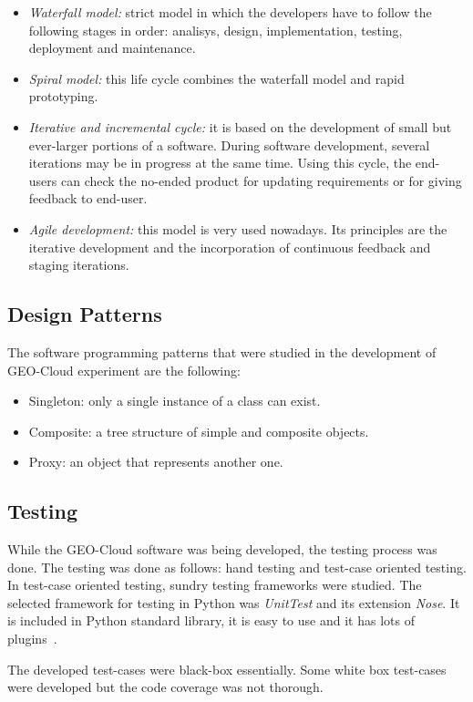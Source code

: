 \begin{itemize}
\item \emph{Waterfall model:} strict model in which the developers have to
  follow the following stages in order: analisys, design, implementation, testing, deployment and maintenance.
\item \emph{Spiral model:} this life cycle combines the waterfall model and rapid
  prototyping.
\item \emph{Iterative and incremental cycle:} it is based on the development of small but
  ever-larger portions of a software. During software development, several
  iterations may be in progress at the same time. Using this cycle, the
  end-users can check the no-ended product for updating requirements or for giving feedback
  to end-user.
\item \emph{Agile development:} this model is very used nowadays. Its principles
  are the iterative development and the incorporation of continuous feedback and
  staging iterations.
\end{itemize}

\subsection{Design Patterns}

The software programming patterns that were studied in the development of
GEO-Cloud experiment are the following:
\begin{itemize}
\item Singleton: only a single instance of a class can exist.
\item Composite: a tree structure of simple and composite objects.
\item Proxy: an object that represents another one.
\end{itemize}

\subsection{Testing}

While the GEO-Cloud software was being developed, the testing process was
done. The testing was done as follows: hand testing and test-case oriented
testing. In test-case oriented testing, sundry testing frameworks were studied.
The selected framework for testing in Python was \emph{UnitTest} and its
extension \emph{Nose}. It is included in Python standard library, it is easy to use
and it has lots of plugins~\cite{PyUNIT}.

The developed test-cases were black-box essentially. Some white box test-cases
were developed but the code coverage was not thorough.
